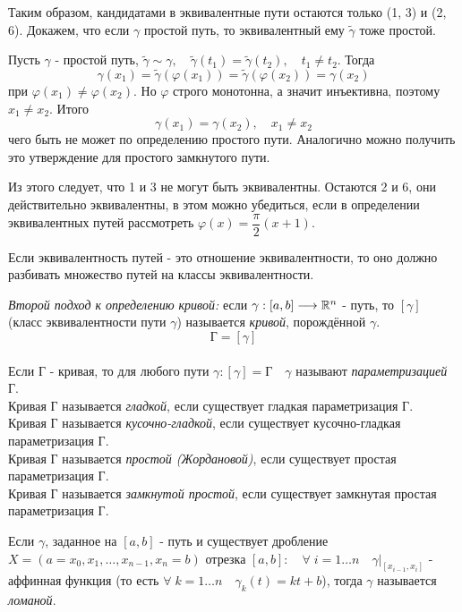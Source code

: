 \documentclass[../main.tex]{subfiles}
\begin{document}
\begin{example}
    Таким образом, кандидатами в эквивалентные пути остаются только (1, 3) и (2, 6). Докажем, что если \( \gamma \) простой путь, то эквивалентный ему \( \tilde{ \gamma }\) тоже простой. 

    Пусть \( \gamma \) - простой путь, \( \tilde{ \gamma } \sim \gamma,\quad  \tilde{ \gamma }\left( t_1\right)= \tilde{ \gamma } \left( t_2\right),\quad t_1 \neq t_2\). Тогда 
    \[ \gamma \left( x_1\right)= \tilde{ \gamma }\left( \varphi \left( x_1\right)\right)= \tilde{ \gamma }\left( \varphi \left( x_2\right)\right)= \gamma \left( x_2\right)\]
    при \( \varphi \left( x_1\right) \neq \varphi \left( x_2\right)\). Но \( \varphi \) строго монотонна, а значит инъективна, поэтому \( x_1 \neq x_2\). Итого
    \[ \gamma \left( x_1\right)= \gamma \left( x_2\right),\quad x_1 \neq x_2\]
    чего быть не может по определению простого пути. Аналогично можно получить это утверждение для простого замкнутого пути. 

    Из этого следует, что 1 и 3 не могут быть эквивалентны. Остаются 2 и 6, они действительно эквивалентны, в этом можно убедиться, если в определении эквивалентных путей рассмотреть \( \varphi\left( x\right)=\dfrac{ \pi}{ 2}\left( x+1\right) \).
\end{example}

Если эквивалентность путей - это отношение эквивалентности, то оно должно разбивать множество путей на классы эквивалентности. 

\emph{Второй подход к определению кривой:} если \( \gamma :\left[ a,b\right] \longrightarrow \mathbb{R}^{n} \) - путь, то \( \left[ \gamma \right]\) (класс эквивалентности пути \( \gamma \)) называется \emph{кривой}, порождённой \( \gamma \). 
\[ \text{Г}=\left[ \gamma \right]\]
\\
Если Г - кривая, то для любого пути \( \gamma: \left[ \gamma \right]=\text{Г}\quad  \gamma \) называют \emph{параметризацией} Г.
\\
Кривая Г называется \emph{гладкой}, если существует гладкая параметризация Г.
\\
Кривая Г называется \emph{кусочно-гладкой}, если существует кусочно-гладкая параметризация Г.
\\
Кривая Г называется \emph{простой (Жордановой)}, если существует простая параметризация Г.
\\
Кривая Г называется \emph{замкнутой простой}, если существует замкнутая простая параметризация Г.

Если \( \gamma \), заданное на \( \left[ a,b\right]\) - путь и существует дробление \( X=\left( a=x_0, x_1, \dots,x_{n-1}, x_n=b\right)\) отрезка \( \left[ a,b\right]:\quad  \forall \; i=1 \dots n\quad \gamma |_{\left[ x_{i-1 },x_i\right]}\) - аффинная функция (то есть \( \forall \; k=1 \dots n\quad \gamma _k\left( t\right)=kt+b\)), тогда \( \gamma \) называется \emph{ломаной}. 
\end{document}
